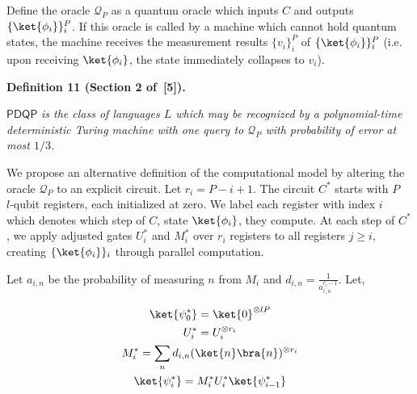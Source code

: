 \documentclass[10pt,a4paper]{article}
\begin{document}
Define the oracle $\mathcal{Q}_{P}$ as a quantum oracle which inputs $C$ and outputs $\{\ket{\phi_{i}}\}_{i}^{P}$. If this oracle is called by a machine which cannot hold quantum states, the machine receives the measurement results $\{v_{i}\}_{i}^{P}$ of $\{\ket{\phi_{i}}\}_{i}^{P}$ (i.e. upon receiving $\ket{\phi_{i}}$, the state immediately collapses to $v_{i}$).\par





\par\medskip\noindent\textbf{
\textbf{Definition 11}\textbf{ }(Section 2 of [5])\textbf{.}
}\par



$\mathsf{PDQP}$\emph{ is the class of languages $L$ which may be recognized by a polynomial-time deterministic Turing machine with one query to $\mathcal{Q}_{P}$ with probability of error at most $1/3$.}\par






We propose an alternative definition of the computational model by altering the oracle $\mathcal{Q}_{P}$ to an explicit circuit. Let $r_{i}=P-i+1$. The circuit $C^{*}$ starts with $P$ $l\text{-qubit}$ registers, each initialized at zero. We label each register with index $i$ which denotes which step of $C$, state $\ket{\phi_{i}}$, they compute. At each step of $C^{*}$, we apply adjusted gates $U^{*}_{i}$ and $M^{*}_{i}$ over $r_{i}$ registers to all registers $j\geq i$, creating $\{\ket{\phi_{i}}\}_{i}$ through parallel computation.\par




Let $a_{i,n}$ be the probability of measuring $n$ from $M_{i}$ and $d_{i,n}=\frac{1}{a_{i,n}^{r_{i}-1}}$. Let,\par


\[\begin{gathered}
\displaystyle\ket{\psi_{0}^{*}} \displaystyle=\ket{0}^{\otimes lP} \\
\displaystyle U_{i}^{*} \displaystyle=U_{i}^{\otimes r_{i}} \\
\displaystyle M_{i}^{*} \displaystyle=\sum_{n}d_{i,n}(\ket{n}\bra{n})^{\otimes r_{i}} \\
\displaystyle\ket{\psi_{i}^{*}} \displaystyle=M_{i}^{*}U_{i}^{*}\ket{\psi_{i-1}^{*}}
\end{gathered}\]
\end{document}
